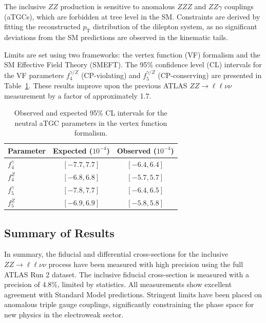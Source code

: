 The inclusive $ZZ$ production is sensitive to anomalous $ZZZ$ and $ZZ\gamma$ couplings (aTGCs), which are forbidden at tree level in the SM. Constraints are derived by fitting the reconstructed $p_{\mathrm{T}}$ distribution of the dilepton system, as no significant deviations from the SM predictions are observed in the kinematic tails.

Limits are set using two frameworks: the vertex function (VF) formalism and the SM Effective Field Theory (SMEFT). The 95\% confidence level (CL) intervals for the VF parameters $f_4^{\gamma/Z}$ (CP-violating) and $f_5^{\gamma/Z}$ (CP-conserving) are presented in Table~\ref{tab:atgc_limits}. These results improve upon the previous ATLAS $ZZ \to \ell\ell\nu\nu$ measurement by a factor of approximately 1.7.

\begin{table}[htbp]
    \centering
    \caption{Observed and expected 95\% CL intervals for the neutral aTGC parameters in the vertex function formalism.}
    \label{tab:atgc_limits}
    \begin{tabular}{lcc}
        \hline
        Parameter & Expected ($10^{-4}$) & Observed ($10^{-4}$) \\
        \hline
        $f_4^{\gamma}$ & $[-7.7, 7.7]$ & $[-6.4, 6.4]$ \\
        $f_4^{Z}$ & $[-6.8, 6.8]$ & $[-5.7, 5.7]$ \\
        $f_5^{\gamma}$ & $[-7.8, 7.7]$ & $[-6.4, 6.5]$ \\
        $f_5^{Z}$ & $[-6.9, 6.9]$ & $[-5.8, 5.8]$ \\
        \hline
    \end{tabular}
\end{table}

\subsection{Summary of Results}

In summary, the fiducial and differential cross-sections for the inclusive $ZZ \to \ell\ell\nu\nu$ process have been measured with high precision using the full ATLAS Run 2 dataset. The inclusive fiducial cross-section is measured with a precision of 4.8\%, limited by statistics. All measurements show excellent agreement with Standard Model predictions. Stringent limits have been placed on anomalous triple gauge couplings, significantly constraining the phase space for new physics in the electroweak sector.